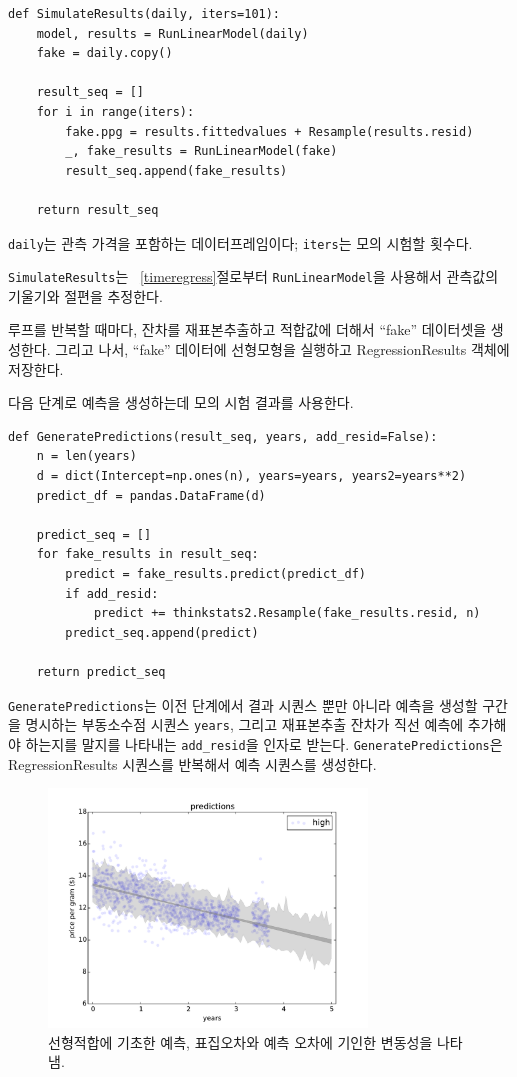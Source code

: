 \begin{verbatim}
def SimulateResults(daily, iters=101):
    model, results = RunLinearModel(daily)
    fake = daily.copy()
    
    result_seq = []
    for i in range(iters):
        fake.ppg = results.fittedvalues + Resample(results.resid)
        _, fake_results = RunLinearModel(fake)
        result_seq.append(fake_results)

    return result_seq
\end{verbatim}

{\tt daily}는 관측 가격을 포함하는 데이터프레임이다;
{\tt iters}는 모의 시험할 횟수다.

{\tt SimulateResults}는 ~\ref{timeregress}절로부터 {\tt RunLinearModel}을 사용해서 관측값의 기울기와 절편을 추정한다.

루프를 반복할 때마다, 잔차를 재표본추출하고 적합값에 더해서 ``fake'' 데이터셋을 생성한다. 그리고 나서, ``fake'' 데이터에 선형모형을 실행하고 RegressionResults 객체에 저장한다.

다음 단계로 예측을 생성하는데 모의 시험 결과를 사용한다.

\begin{verbatim}
def GeneratePredictions(result_seq, years, add_resid=False):
    n = len(years)
    d = dict(Intercept=np.ones(n), years=years, years2=years**2)
    predict_df = pandas.DataFrame(d)
    
    predict_seq = []
    for fake_results in result_seq:
        predict = fake_results.predict(predict_df)
        if add_resid:
            predict += thinkstats2.Resample(fake_results.resid, n)
        predict_seq.append(predict)

    return predict_seq
\end{verbatim}

{\tt GeneratePredictions}는 이전 단계에서 결과 시퀀스 뿐만 아니라 
예측을 생성할 구간을 명시하는 부동소수점 시퀀스 {\tt years}, 그리고 재표본추출 잔차가 직선 예측에 추가해야 하는지를 말지를 나타내는 \verb"add_resid"을 인자로 받는다.
{\tt GeneratePredictions}은 RegressionResults 시퀀스를 반복해서 예측 시퀀스를 생성한다.

\begin{figure}
\centerline{\includegraphics[height=2.5in]{figs/timeseries4.pdf}}
\caption{선형적합에 기초한 예측, 표집오차와 예측 오차에 기인한 변동성을 나타냄.}
\label{timeseries4}
\end{figure}

